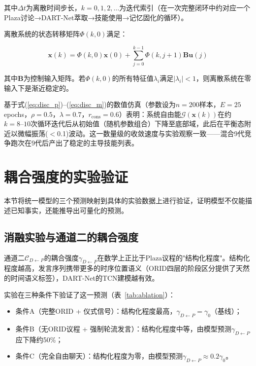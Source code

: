 \documentclass[twocolumn,10.5pt]{ctexart}
\def\cG{\mathcal{G}}
\begin{document}
其中$\Delta t$为离散时间步长，$k = 0,1,2,\ldots$为迭代索引（在一次完整闭环中约对应一个Plaza讨论→DART-Net萃取→技能使用→记忆固化的循环）。

离散系统的状态转移矩阵$\Phi(k, 0)$满足：

\begin{equation}
\mathbf{x}(k) = \Phi(k, 0) \mathbf{x}(0) + \sum_{j=0}^{k-1} \Phi(k, j+1) \mathbf{B} \mathbf{u}(j)
\label{eq:state_transition}
\end{equation}

其中$\mathbf{B}$为控制输入矩阵。若$\Phi(k, 0)$的所有特征值$\lambda_i$满足$|\lambda_i| < 1$，则离散系统在零输入下是渐近稳定的。

基于式(\ref{eq:disc_p})--(\ref{eq:disc_m})的数值仿真（参数设为$n=200$样本，$E=25$ epochs，$\rho=0.5$，$\lambda=0.7$，$r_{\text{cons}}=0.6$）表明：系统自由能$\cG(\mathbf{x}(k))$在约$k=8\text{--}10$次循环迭代后从初始值（随机参数组合）下降至底部域，此后在平衡态附近以微幅振荡($<$0.1)波动。这一数量级的收敛速度与实验观察一致——混合9代竞争跑次在9代后产出了稳定的主导技能列表。

\section{耦合强度的实验验证}

本节将统一模型的三个预测映射到具体的实验数据上进行验证，证明模型不仅能描述已知事实，还能推导出可量化的预测。

\subsection{消融实验与通道二的耦合强度}

通道二$\mathcal{C}_{D\leftarrow P}$的耦合强度$\gamma_{D\leftarrow P}$在数学上正比于Plaza议程的"结构化程度"。结构化程度越高，发言序列携带更多的时序位置语义（ORID四层的阶段区分提供了天然的时间语义标签），DART-Net的TCN建模越有效。

实验在三种条件下验证了这一预测（表~\ref{tab:ablation}）：
\begin{itemize}[nosep]
\item 条件A（完整ORID + 仪式信号）：结构化程度最高，$\gamma_{D\leftarrow P} = \gamma_0$（基线）；
\item 条件B（无ORID议程 + 强制轮流发言）：结构化程度中等，由模型预测$\gamma_{D\leftarrow P}$应下降约50\%；
\item 条件C（完全自由聊天）：结构化程度为零，由模型预测$\gamma_{D\leftarrow P} \approx 0.2\gamma_0$。
\end{itemize}
\end{document}
